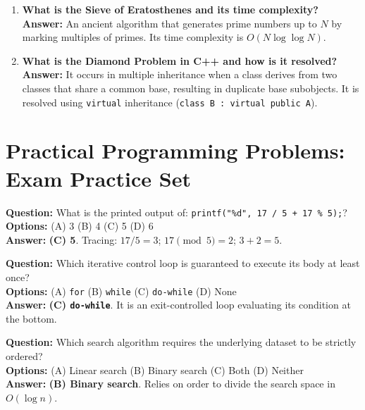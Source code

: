 \begin{enumerate}[leftmargin=*,label=\textbf{Q\arabic*.}]
    \textbf{Answer:} \texttt{a++} (postfix) yields the current value before incrementing. \texttt{++a} (prefix) increments the variable first and yields the updated value.
    \item \textbf{What is the Sieve of Eratosthenes and its time complexity?} \\
    \textbf{Answer:} An ancient algorithm that generates prime numbers up to $N$ by marking multiples of primes. Its time complexity is $O(N \log \log N)$.
    \item \textbf{What is the Diamond Problem in C++ and how is it resolved?} \\
    \textbf{Answer:} It occurs in multiple inheritance when a class derives from two classes that share a common base, resulting in duplicate base subobjects. It is resolved using \texttt{virtual} inheritance (\texttt{class B : virtual public A}).
\end{enumerate}

\section{Practical Programming Problems: Exam Practice Set}
\label{sec:exam_practice_set}

\begin{tcolorbox}[colback=white,colframe=primary,title=\textbf{Self-Test Question 1}]
\textbf{Question:} What is the printed output of: \texttt{printf("\%d", 17 / 5 + 17 \% 5);}? \\
\textbf{Options:} (A) 3 \quad (B) 4 \quad (C) 5 \quad (D) 6 \\
\textbf{Answer:} \textbf{(C) 5}. Tracing: $17 / 5 = 3$; $17 \pmod 5 = 2$; $3 + 2 = 5$.
\end{tcolorbox}

\begin{tcolorbox}[colback=white,colframe=primary,title=\textbf{Self-Test Question 2}]
\textbf{Question:} Which iterative control loop is guaranteed to execute its body at least once? \\
\textbf{Options:} (A) \texttt{for} \quad (B) \texttt{while} \quad (C) \texttt{do-while} \quad (D) None \\
\textbf{Answer:} \textbf{(C) \texttt{do-while}}. It is an exit-controlled loop evaluating its condition at the bottom.
\end{tcolorbox}

\begin{tcolorbox}[colback=white,colframe=primary,title=\textbf{Self-Test Question 3}]
\textbf{Question:} Which search algorithm requires the underlying dataset to be strictly ordered? \\
\textbf{Options:} (A) Linear search \quad (B) Binary search \quad (C) Both \quad (D) Neither \\
\textbf{Answer:} \textbf{(B) Binary search}. Relies on order to divide the search space in $O(\log n)$.
\end{tcolorbox}

